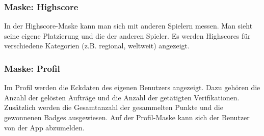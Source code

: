 \begin{figure}[H]
\hfill
{}
\end{figure}

\cleardoublepage
\subsubsection{Maske: Highscore}
In der Highscore-Maske kann man sich mit anderen Spielern messen.
Man sieht seine eigene Platzierung und die der anderen Spieler.
Es werden Highscores für verschiedene Kategorien (z.B. regional, weltweit) angezeigt.

\subsubsection{Maske: Profil}
Im Profil werden die Eckdaten des eigenen Benutzers angezeigt.
Dazu gehören die Anzahl der gelösten Aufträge und die Anzahl der getätigten Verifikationen.
Zusätzlich werden die Gesamtanzahl der gesammelten Punkte und die gewonnenen Badges ausgewiesen.
Auf der Profil-Maske kann sich der Benutzer von der App abzumelden.

